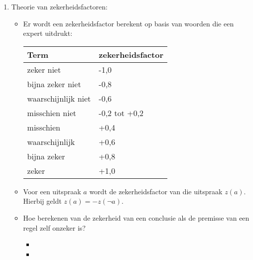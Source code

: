 \begin{itemize}
\begin{itemize}
\begin{enumerate}
\begin{itemize}
				\alert Bayesiaans redeneren is geen aangewezen methode.
			\end{itemize}
			\item Theorie van zekerheidsfactoren:
			\begin{itemize}
				\item Er wordt een zekerheidsfactor berekent op basis van woorden die een expert uitdrukt:
				\begin{table}[h]
					\centering
					\begin{tabular}{| l | l |}
						\hline 
						Term & zekerheidsfactor \\
						\hline 
						zeker niet & -1,0 \\
						bijna zeker niet & -0,8 \\
						waarschijnlijk niet & -0,6 \\
						misschien niet & -0,2 tot +0,2 \\
						misschien & +0,4 \\
						waarschijnlijk & +0,6 \\
						bijna zeker & +0,8 \\
						zeker & +1,0 \\
						\hline
					\end{tabular}
				\end{table}
			
				\item Voor een uitspraak $a$ wordt de zekerheidsfactor van die uitspraak $z(a)$. Hierbij geldt $z(a) = -z(\neg a)$.
				
				\item Hoe berekenen van de zekerheid van een conclusie als de premisse van een regel zelf onzeker is?
				
				\begin{itemize}
					
					\item[] \noindent{}
		
					\item[]
					\noindent{}
					

\end{itemize}
\end{itemize}
\end{enumerate}
\end{itemize}
\end{itemize}
